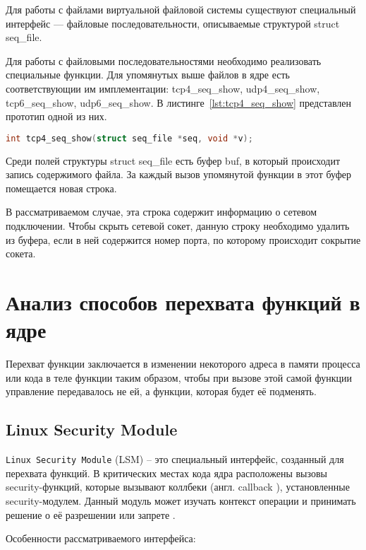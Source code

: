 Для работы с файлами виртуальной файловой системы существуют
специальный интерфейс — файловые последовательности, описываемые структурой struct seq\_file.

Для работы с файловыми последовательностями необходимо реализовать
специальные функции. Для упомянутых выше файлов в ядре есть соответствующии им имплементации: tcp4\_seq\_show, udp4\_seq\_show, tcp6\_seq\_show,
udp6\_seq\_show. В листинге~\ref{lst:tcp4_seq_show} представлен прототип одной из них.

\begin{lstlisting}[language=c,caption={Прототип tcp4\_seq\_show},label=lst:tcp4_seq_show]
int tcp4_seq_show(struct seq_file *seq, void *v);
\end{lstlisting}

Среди полей структуры struct seq\_file есть буфер buf, в который происходит запись содержимого файла. За каждый вызов упомянутой функции в этот буфер помещается новая строка.

В рассматриваемом случае, эта строка содержит информацию о сетевом подключении. Чтобы скрыть сетевой сокет, данную строку необходимо удалить из буфера, если в ней содержится номер порта, по которому происходит сокрытие сокета.





\section{Анализ способов перехвата функций в ядре}
Перехват функции заключается в изменении некоторого адреса в памяти процесса или кода в теле функции таким образом, чтобы при вызове этой самой функции управление передавалось не ей, а функции, которая будет её подменять.


\subsection{Linux Security Module}

\texttt{Linux Security Module} (LSM) \cite{linux-security-api} -- это специальный интерфейс, созданный для перехвата функций. В критических местах кода ядра расположены вызовы security-функций, которые вызывают коллбеки (англ. callback \cite{callback}), установленные security-модулем. Данный модуль может изучать контекст операции и принимать решение о её разрешении или запрете \cite{linux-security-api}.

Особенности рассматриваемого интерфейса:

